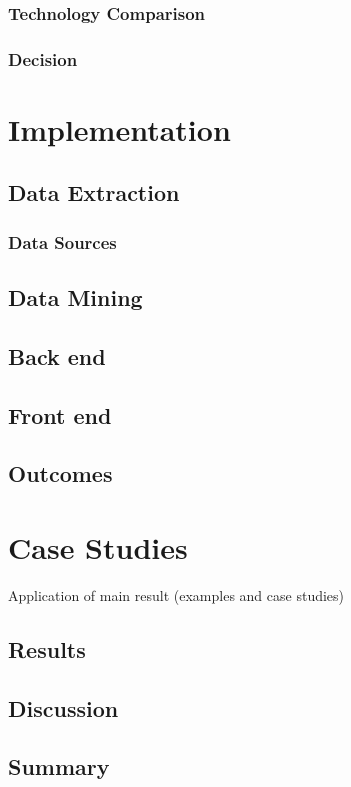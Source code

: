 \documentclass[
  oneside,
  11pt, a4paper,
  footinclude=true,
  headinclude=true,
  cleardoublepage=empty
]{scrbook}
\begin{document}
	\subsection{Technology Comparison}
	\subsection{Decision}
	
	
	\chapter{Implementation}
	\section{Data Extraction}
	\subsection{Data Sources} %
	\section{Data Mining}
	\section{Back end}
	\section{Front end}
	\section{Outcomes}


	\chapter{Case Studies}
	Application of main result (examples and case studies)
    	\section{Results}
    	\section{Discussion}
	\section{Summary}
\end{document}
